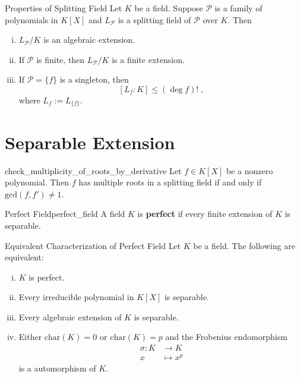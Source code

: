 \begin{proposition}{Properties of Splitting Field}{}
    Let $K$ be a field. Suppose $\mathcal{P}$ is a family of polynomials in $K[X]$ and $L_\mathcal{P}$ is a splitting field of $\mathcal{P}$ over $K$. Then
    \begin{enumerate}[(i)]
        \item $L_\mathcal{P}/K$ is an algebraic extension.
        \item If $\mathcal{P}$ is finite, then $L_\mathcal{P}/K$ is a finite extension.
        \item If $\mathcal{P}=\{f\}$ is a singleton, then
        \[
        \left[L_f:K\right]\le\left(\deg f\right)!\;,
        \]
        where $L_f:=L_{\{f\}}$.
    \end{enumerate}
\end{proposition}

    

\section{Separable Extension}

\begin{proposition}{}{check_multiplicity_of_roots_by_derivative}
    Let $f\in K[X]$ be a nonzero polynomial. Then $f$ has multiple roots in a splitting field if and only if $\mathrm{gcd}(f,f')\ne 1$.
\end{proposition}

\begin{definition}{Perfect Field}{perfect_field}
    A field $K$ is \textbf{perfect} if every finite extension of $K$ is separable.
\end{definition}

\begin{definition}{Equivalent Characterization of Perfect Field}{}
    Let $K$ be a field. The following are equivalent:
    \begin{enumerate}[(i)]
        \item $K$ is perfect.
        \item Every irreducible polynomial in $K[X]$ is separable.
        \item Every algebraic extension of $K$ is separable.
        \item Either $\mathrm{char}(K)=0$ or $\mathrm{char}(K)=p$ and the Frobenius endomorphism 
        \begin{align*}
            \sigma:K&\longrightarrow K\\
            x&\longmapsto x^p
        \end{align*}
        is a automorphism of $K$.
    \end{enumerate}
    
\end{definition}

